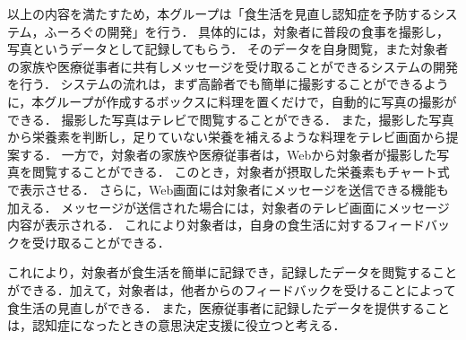 \documentclass[../report]{subfiles}
\begin{document}
以上の内容を満たすため，本グループは「食生活を見直し認知症を予防するシステム，ふーろぐの開発」を行う．
具体的には，対象者に普段の食事を撮影し，写真というデータとして記録してもらう．
そのデータを自身閲覧，また対象者の家族や医療従事者に共有しメッセージを受け取ることができるシステムの開発を行う．
システムの流れは，まず高齢者でも簡単に撮影することができるように，本グループが作成するボックスに料理を置くだけで，自動的に写真の撮影ができる．
撮影した写真はテレビで閲覧することができる．
また，撮影した写真から栄養素を判断し，足りていない栄養を補えるような料理をテレビ画面から提案する．
一方で，対象者の家族や医療従事者は，Webから対象者が撮影した写真を閲覧することができる．
このとき，対象者が摂取した栄養素もチャート式で表示させる．
さらに，Web画面には対象者にメッセージを送信できる機能も加える．
メッセージが送信された場合には，対象者のテレビ画面にメッセージ内容が表示される．
これにより対象者は，自身の食生活に対するフィードバックを受け取ることができる．

これにより，対象者が食生活を簡単に記録でき，記録したデータを閲覧することができる．加えて，対象者は，他者からのフィードバックを受けることによって食生活の見直しができる．
また，医療従事者に記録したデータを提供することは，認知症になったときの意思決定支援に役立つと考える．
\end{document}
